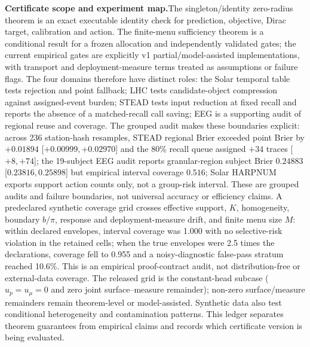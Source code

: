 \documentclass[10pt]{article}
\begin{document}
\textbf{Certificate scope and experiment map.}\;The singleton/identity zero-radius theorem is an exact executable identity check for prediction, objective, Dirac target, calibration and action. The finite-menu sufficiency theorem is a conditional result for a frozen allocation and independently validated gates; the current empirical gates are explicitly v1 partial/model-assisted implementations, with transport and deployment-measure terms treated as assumptions or failure flags. The four domains therefore have distinct roles: the Solar temporal table tests rejection and point fallback; LHC tests candidate-object compression against assigned-event burden; STEAD tests input reduction at fixed recall and reports the absence of a matched-recall call saving; EEG is a supporting audit of regional reuse and coverage. The grouped audit makes these boundaries explicit: across 236 station-hash resamples, STEAD regional Brier exceeded point Brier by $+0.01894$ [$+0.00999,+0.02970$] and the 80\% recall queue assigned $+34$ traces [$+8,+74$]; the 19-subject EEG audit reports granular-region subject Brier $0.24883$ [$0.23816,0.25898$] but empirical interval coverage $0.516$; Solar HARPNUM exports support action counts only, not a group-risk interval. These are grouped audits and failure boundaries, not universal accuracy or efficiency claims. A predeclared synthetic coverage grid crosses effective support, $K$, homogeneity, boundary $b/\pi$, response and deployment-measure drift, and finite menu size $M$: within declared envelopes, interval coverage was 1.000 with no selective-risk violation in the retained cells; when the true envelopes were 2.5 times the declarations, coverage fell to 0.955 and a noisy-diagnostic false-pass stratum reached 10.6\%. This is an empirical proof-contract audit, not distribution-free or external-data coverage. The released grid is the constant-head subcase ($u_p=u_\mu=0$ and zero joint surface--measure remainder); non-zero surface/measure remainders remain theorem-level or model-assisted. Synthetic data also test conditional heterogeneity and contamination patterns. This ledger separates theorem guarantees from empirical claims and records which certificate version is being evaluated.
\end{document}
